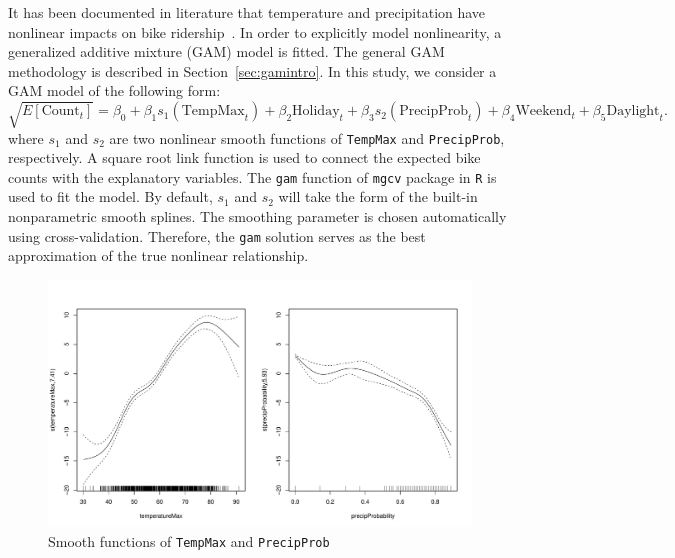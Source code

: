 \documentclass [11pt, proquest] {uwthesis}[2015/03/03]
\begin{document}
It has been documented in literature that temperature and precipitation have nonlinear impacts on bike ridership~\cite{Richardson:2000aa,Rose07}. In order to explicitly model nonlinearity, a generalized additive mixture (GAM) model is fitted. The general GAM methodology is described in Section~\ref{sec:gamintro}. In this study, we consider a GAM model of the following form:
\begin{equation}
\sqrt{E[\text{Count}_t]} = \beta_0 + \beta_1 s_1(\text{TempMax}_t) + \beta_2 \text{Holiday}_t + \beta_3 s_2(\text{PrecipProb}_t) + \beta_4 \text{Weekend}_t + \beta_5 \text{Daylight}_t. \label{eqref:gamodel}
\end{equation}
where $s_1$ and $s_2$ are two nonlinear smooth functions of \texttt{TempMax} and \texttt{PrecipProb}, respectively. A square root link function is used to connect the expected bike counts with the explanatory variables. The \texttt{gam} function of \texttt{mgcv} package in \texttt{R} is used to fit the model. By default, $s_1$ and $s_2$ will take the form of the built-in nonparametric smooth splines. The smoothing parameter is chosen automatically using cross-validation. Therefore, the \texttt{gam} solution serves as the best approximation of the true nonlinear relationship.



\begin{figure}
\centering
   \includegraphics[width=1\textwidth]{figures/gam.pdf} 
\vspace{-1cm}
  \caption{Smooth functions of \texttt{TempMax} and \texttt{PrecipProb}}
  \label{fig:smooth}
\vspace{-1.05cm}
\end{figure}
\end{document}
